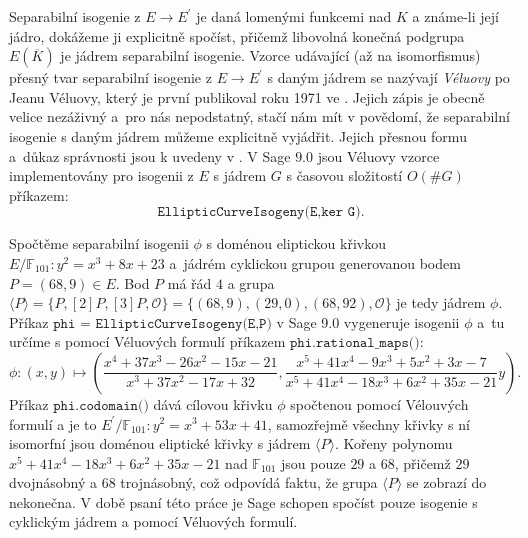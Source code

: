 \documentclass[12pt]{report}
\begin{document}
Separabilní isogenie z $E \longrightarrow E^\prime$ je daná lomenými funkcemi nad $K$ a známe-li její jádro, dokážeme ji explicitně spočíst, přičemž libovolná konečná podgrupa $E(\overline{K})$ je jádrem separabilní isogenie. Vzorce udávající (až na isomorfismus) přesný tvar separabilní isogenie z $E \longrightarrow E^\prime$ s daným jádrem se nazývají \textit{Véluovy} po Jeanu Véluovy, který je první publikoval roku 1971 ve \cite{Velu}. Jejich zápis je obecně velice nezáživný a~pro nás nepodstatný, stačí nám mít v povědomí, že separabilní isogenie s daným jádrem můžeme explicitně vyjádřit. Jejich přesnou formu a~důkaz správnosti jsou k uvedeny v \cite[Ch.~8.2]{DeFeo}. V Sage $9.0$ jsou Véluovy vzorce implementovány pro isogenii z $E$ s jádrem $G$ s časovou složitostí $O(\# G)$ příkazem:
\begin{equation*}
\texttt{EllipticCurveIsogeny(E,ker G)}.
\end{equation*}

\begin{priklad}
Spočtěme separabilní isogenii $\phi$ s doménou eliptickou křivkou $E/\mathbb{F}_{101} : y^2 = x^3+8x+23$ a~jádrém cyklickou grupou generovanou bodem $P =(68,9) \in E$. Bod $P$ má řád $4$ a grupa $\langle P \rangle = \lbrace P,[2]P,[3]P,\mathcal{O}\rbrace = \lbrace (68,9),(29,0), (68,92),\mathcal{O} \rbrace$ je tedy jádrem $\phi$. Příkaz $\texttt{phi = EllipticCurveIsogeny(E,P)}$ v Sage 9.0 vygeneruje isogenii $\phi$ a~tu určíme s pomocí Véluových formulí příkazem $\texttt{phi.rational\_maps()}$:
\begin{equation*}
\phi : (x,y) \longmapsto \left(\frac{x^4 + 37 x^3 - 26 x^2 - 15x - 21}{x^3 + 37 x^2 - 17 x + 32},\frac{x^5 + 41 x^4 - 9 x^3 + 5 x^2 + 3x - 7}{x^5 + 41 x^4 - 18 x^3 + 6 x^2 + 35x - 21} y  \right). 
\end{equation*}
Příkaz $\texttt{phi.codomain()}$ dává cílovou křivku $\phi$ spočtenou pomocí Vélouvých formulí a je to $E^\prime/\mathbb{F}_{101} : y^2 = x^3 + 53 x + 41$, samozřejmě všechny křivky s ní isomorfní jsou doménou eliptické křivky s jádrem $\langle P \rangle$. Kořeny polynomu $x^5 + 41 x^4 - 18 x^3 + 6 x^2 + 35x - 21$ nad $\mathbb{F}_{101}$ jsou pouze $29$ a $68$, přičemž $29$ dvojnásobný a $68$ trojnásobný, což odpovídá faktu, že grupa $\langle P \rangle$ se zobrazí do nekonečna. V době psaní této práce je Sage schopen spočíst pouze isogenie s cyklickým jádrem a pomocí Véluových formulí.
\end{priklad}
\end{document}
